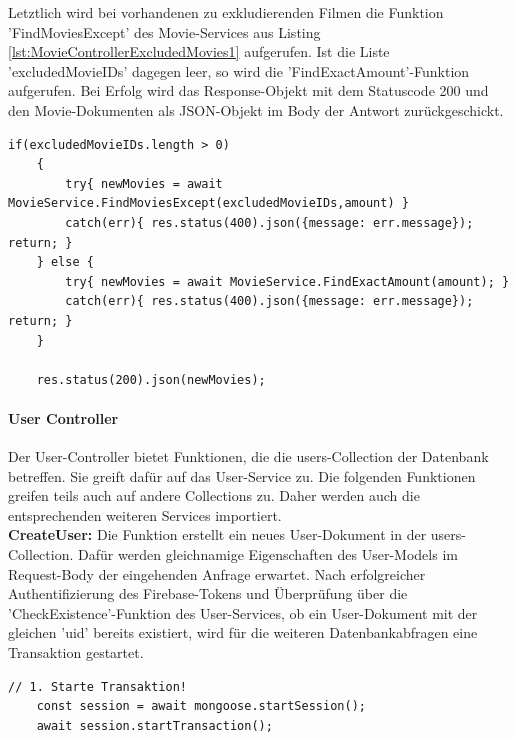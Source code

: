 \noindent
Letztlich wird bei vorhandenen zu exkludierenden Filmen die Funktion 'FindMoviesExcept' des Movie-Services aus Listing \ref{lst:MovieControllerExcludedMovies1}  aufgerufen.  Ist die Liste 'excludedMovieIDs' dagegen leer, so wird die 'Find\-ExactAmount'-Funktion aufgerufen. Bei Erfolg wird das Response-Objekt mit dem Statuscode 200 und den Movie-Dokumenten als JSON-Objekt im Body der Antwort zurückgeschickt.\\

\begin{lstlisting}[caption=MovieController - RequestMovie - Excluded Movies, label=lst:MovieControllerExcludedMovies1]
    if(excludedMovieIDs.length > 0)
    {
        try{ newMovies = await MovieService.FindMoviesExcept(excludedMovieIDs,amount) } 
        catch(err){ res.status(400).json({message: err.message}); return; }
    } else {
        try{ newMovies = await MovieService.FindExactAmount(amount); } 
        catch(err){ res.status(400).json({message: err.message}); return; }
    }

    res.status(200).json(newMovies);
\end{lstlisting}




%
%



\paragraph{User Controller}
Der User-Controller bietet Funktionen, die die users-Collection der Datenbank betreffen. Sie greift dafür auf das User-Service zu. Die folgenden Funktionen greifen teils auch auf andere Collections zu. Daher werden auch die entsprechenden weiteren Services importiert.\\

\noindent
\textbf{CreateUser:}
Die Funktion erstellt ein neues User-Dokument in der users-Collection. Dafür werden gleichnamige Eigenschaften des User-Models im Request-Body der eingehenden Anfrage erwartet. Nach erfolgreicher Authentifizierung des Firebase-Tokens und Überprüfung über die 'CheckExistence'-Funktion des User-Services, ob ein User-Dokument mit der gleichen 'uid' bereits existiert, wird für die weiteren Datenbankabfragen eine Transaktion gestartet.\\

\begin{lstlisting}[caption=UserController - Create User - Transaktionsstart, label=lst:UserControllertransaction]
    // 1. Starte Transaktion!
    const session = await mongoose.startSession();
    await session.startTransaction();
\end{lstlisting}


